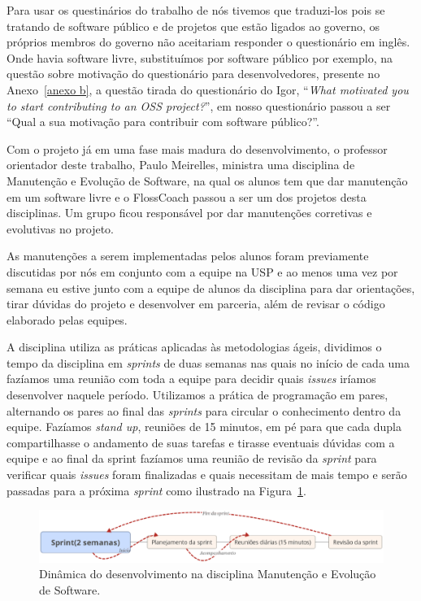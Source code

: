 Para usar os questinários do trabalho de  nós tivemos que traduzi-los pois se tratando de
software público e de projetos que estão ligados ao governo, os próprios membros 
do governo não aceitariam responder o questionário em inglês. Onde havia software 
livre, substituímos por software público por exemplo, na questão sobre motivação
do questionário para desenvolvedores, presente no Anexo~\ref{anexo b}, a questão 
tirada do questionário do Igor, ``\textit{What motivated you to start contributing 
to an OSS project?}'', em nosso questionário passou a ser ``Qual a sua motivação para 
contribuir com software público?''.

Com o projeto já em uma fase mais madura do desenvolvimento, o professor orientador
deste trabalho, Paulo Meirelles, ministra uma disciplina de Manutenção e Evolução de
Software, na qual os alunos tem que dar manutenção em um software livre e o FlossCoach
passou a ser um dos projetos desta disciplinas. Um grupo ficou responsável por dar 
manutenções corretivas e evolutivas no projeto.

As manutenções a serem implementadas pelos alunos foram previamente discutidas
por nós em conjunto com a equipe na USP e ao menos uma vez por semana eu estive junto com a 
equipe de alunos da disciplina para dar orientações, tirar dúvidas do projeto
e desenvolver em parceria, além de revisar o código elaborado pelas equipes.
 
A disciplina utiliza as práticas aplicadas às metodologias ágeis, dividimos o tempo 
da disciplina em \textit{sprints} de duas semanas nas quais no início de cada uma 
fazíamos uma reunião com toda a equipe para decidir quais \textit{issues} iríamos 
desenvolver naquele período. Utilizamos a prática de programação em pares, alternando
os pares ao final das \textit{sprints} para circular o conhecimento dentro da equipe.
Fazíamos \textit{stand up}, reuniões de 15 minutos, em pé para que cada dupla compartilhasse
o andamento de suas tarefas e tirasse eventuais dúvidas com a equipe e ao final da sprint 
fazíamos uma reunião de revisão da \textit{sprint} para verificar quais \textit{issues} foram finalizadas e quais 
necessitam de mais tempo e serão passadas para a próxima \textit{sprint} como ilustrado na Figura~\ref{fig:disciplina}.

\begin{figure}[h]
	\centering
		\includegraphics[keepaspectratio=true,scale=0.4]{figuras/Sprint.eps}
	\caption{Dinâmica do desenvolvimento na disciplina Manutenção e Evolução de Software.}
	\label{fig:disciplina}
\end{figure}

